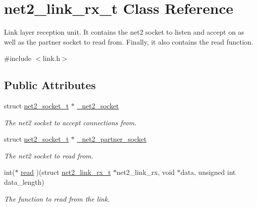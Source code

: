 \hypertarget{structnet2__link__rx__t}{\section{net2\-\_\-link\-\_\-rx\-\_\-t Class Reference}
\label{structnet2__link__rx__t}
}


Link layer reception unit. It contains the net2 socket to listen and accept on as well as the partner socket to read from. Finally, it also contains the read function.  




{\ttfamily \#include $<$link.\-h$>$}

\subsection*{Public Attributes}
\begin{DoxyCompactItemize}
\item 
\hypertarget{structnet2__link__rx__t_a83d0d9ea37e3eadaf8e33583c58b2b09}{struct \hyperlink{structnet2__socket__t}{net2\-\_\-socket\-\_\-t} $\ast$ \hyperlink{structnet2__link__rx__t_a83d0d9ea37e3eadaf8e33583c58b2b09}{\-\_\-net2\-\_\-socket}}\label{structnet2__link__rx__t_a83d0d9ea37e3eadaf8e33583c58b2b09}

\begin{DoxyCompactList}\small\item\em The net2 socket to accept connections from. \end{DoxyCompactList}\item 
\hypertarget{structnet2__link__rx__t_aa8720342c7b6c92c5d3b1b23ffa8af8f}{struct \hyperlink{structnet2__socket__t}{net2\-\_\-socket\-\_\-t} $\ast$ \hyperlink{structnet2__link__rx__t_aa8720342c7b6c92c5d3b1b23ffa8af8f}{\-\_\-net2\-\_\-partner\-\_\-socket}}\label{structnet2__link__rx__t_aa8720342c7b6c92c5d3b1b23ffa8af8f}

\begin{DoxyCompactList}\small\item\em The net2 socket to read from. \end{DoxyCompactList}\item 
\hypertarget{structnet2__link__rx__t_a481aaf6a6a6923c582c1e4f5e67d4333}{int($\ast$ \hyperlink{structnet2__link__rx__t_a481aaf6a6a6923c582c1e4f5e67d4333}{read} )(struct \hyperlink{structnet2__link__rx__t}{net2\-\_\-link\-\_\-rx\-\_\-t} $\ast$net2\-\_\-link\-\_\-rx, void $\ast$data, unsigned int data\-\_\-length)}\label{structnet2__link__rx__t_a481aaf6a6a6923c582c1e4f5e67d4333}

\begin{DoxyCompactList}\small\item\em The function to read from the link. \end{DoxyCompactList}\end{DoxyCompactItemize}


